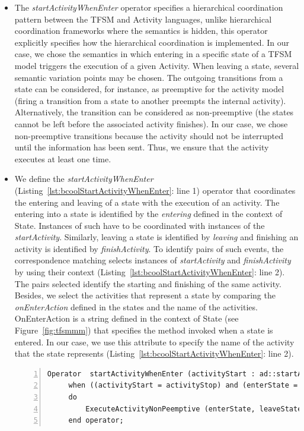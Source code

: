 \begin{itemize}
	 \item The \emph{startActivityWhenEnter} operator specifies a hierarchical coordination pattern between the TFSM and Activity languages, unlike hierarchical coordination frameworks where the semantics is hidden, this operator explicitly specifies how the hierarchical coordination is implemented. In our case, we chose the semantics in which entering in a specific state of a TFSM model triggers the execution of a given Activity. When leaving a state, several semantic variation points may be chosen. The outgoing transitions from a state can be considered, for instance, as preemptive for the activity model (\ie firing a transition from a state to another preempts the internal activity). Alternatively, the transition can be considered as non-preemptive (\ie the states cannot be left before the associated activity finishes). In our case, we chose non-preemptive transitions because the activity should not be interrupted until the information has been sent. Thus, we ensure that the activity executes at least one time.  
	
	
	 \item We define the \emph{startActivityWhenEnter} (Listing~\ref{lst:bcoolStartActivityWhenEnter}: line 1) operator that coordinates the entering and leaving of a state with the execution of an activity. The entering into a state is identified by the \dse \textit{entering} defined in the context of State. Instances of such \dse have to be coordinated with instances of the \dse \textit{startActivity}. Similarly, leaving a state is identified by \dse \textit{leaving} and finishing an activity is identified by \dse \textit{finishActivity}. To identify pairs of such events, the correspondence matching selects instances of \dse \emph{startActivity} and \emph{finishActivity} by using their context (Listing~\ref{lst:bcoolStartActivityWhenEnter}: line 2). The pairs selected identify the starting and finishing of the same activity. Besides, we select the activities that represent a state by comparing the \emph{onEnterAction} defined in the states and the name of the activities. OnEnterAction is a string defined in the context of State (see Figure~\ref{fig:tfsmmm}) that specifies the method invoked when a state is entered. In our case, we use this attribute to specify the name of the activity that the state represents (Listing~\ref{lst:bcoolStartActivityWhenEnter}: line 2).
	
	 
	 \begin{lstlisting}[language=bcool,
	 caption={Hierarchical operator between TFSM and Activity languages},
	 label={lst:bcoolStartActivityWhenEnter}, 
	 basicstyle=\scriptsize\ttfamily, backgroundcolor=\color{LGrey}, numbers=left, xleftmargin=2pt]
	 Operator  startActivityWhenEnter (activityStart : ad::startActivity , activityStop : ad::finishActivity, enterState : tfsm::entering, leaveState : tfsm::leaving)
	 when ((activityStart = activityStop) and (enterState = leaveState) and (activityStart.name = enterState.onEnterAction));
	 do 
		 ExecuteActivityNonPeemptive (enterState, leaveState, activityStart, activityStop)
	 end operator;
	 \end{lstlisting}
	 

\end{itemize}
